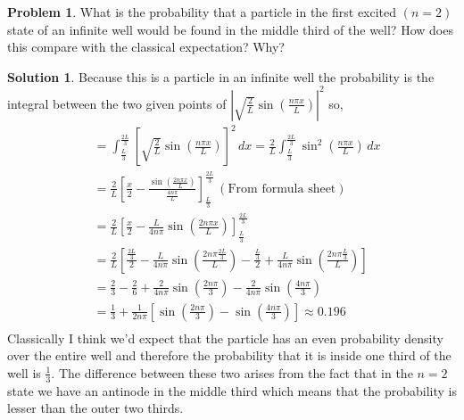 \documentclass[10pt]{article}
\theoremstyle{definition}
\newtheorem{problem}{Problem}
\newtheorem{soln}{Solution}
\begin{document}
\begin{problem}
What is the probability that a particle in the first excited $(n=2)$ state of an infinite well would be
found in the middle third of the well? How does this compare with the classical expectation? Why?
\end{problem}
\begin{soln} Because this is a particle in an infinite well the probability is the integral between the two given points of $\left|\sqrt{\frac{2}{L}}\sin\left(\frac{n\pi x}{L}\right)\right|^2$ so,
  \begin{align*}
     & = \int_{\frac{L}{3}}^{\frac{2L}{3}}\left[\sqrt{\frac{2}{L}}\sin\left(\frac{n\pi x}{L}\right)\right]^2\,dx= \frac{2}{L}\int_{\frac{L}{3}}^{\frac{2L}{3}}\sin^2\left(\frac{n\pi x}{L}\right)\,dx  \\
     & = \frac{2}{L}\left[\frac{x}{2}-\frac{\sin\left(\frac{2n\pi x}{L}\right)}{\frac{4n\pi}{L}}\right]_{\frac{L}{3}}^{\frac{2L}{3}}\,(\text{From formula sheet})                                      \\
     & = \frac{2}{L}\left[\frac{x}{2}-\frac{L}{4n\pi}\sin\left(\frac{2n\pi x}{L}\right)\right]_{\frac{L}{3}}^{\frac{2L}{3}}                                                                            \\
     & = \frac{2}{L}\left[\frac{\frac{2L}{3}}{2}-\frac{L}{4n\pi}\sin\left(\frac{2n\pi \frac{2L}{3}}{L}\right)-\frac{\frac{L}{3}}{2}+\frac{L}{4n\pi}\sin\left(\frac{2n\pi \frac{L}{3}}{L}\right)\right] \\
     & = \frac{2}{3}-\frac{2}{6}+\frac{2}{4n\pi}\sin\left(\frac{2n\pi}{3}\right)-\frac{2}{4n\pi}\sin\left(\frac{4n\pi}{3}\right)                                                                       \\
     & = \frac{1}{3}+\frac{1}{2n\pi}\left[\sin\left(\frac{2n\pi}{3}\right)-\sin\left(\frac{4n\pi}{3}\right)\right]\approx0.196                                                                         \\
  \end{align*}
  Classically I think we'd expect that the particle has an even probability density over the entire well and therefore the probability that it is inside one third of the well is $\frac{1}{3}$.
  The difference between these two arises from the fact that in the $n=2$ state we have an antinode in the middle third which means that the probability is lesser than the outer two thirds.
\end{soln}
\end{document}
